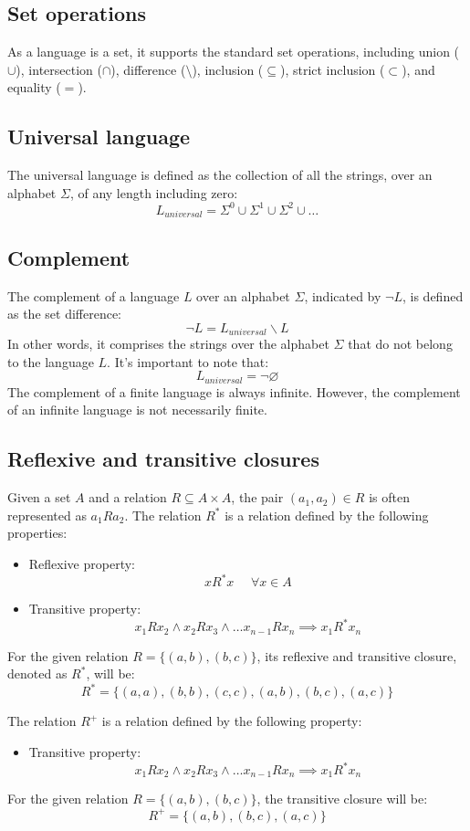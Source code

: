 \subsection*{Set operations}  
As a language is a set, it supports the standard set operations, including union ($\cup$), intersection ($\cap$), difference ($ \setminus $), inclusion ($ \subseteq $), strict inclusion ($ \subset $), and equality ($=$). 

\subsection*{Universal language} 
The universal language is defined as the collection of all the strings, over an alphabet $\Sigma$, of any length including zero: 
\[L_{universal}=\Sigma ^0 \cup \Sigma ^1 \cup \Sigma ^2 \cup \dots \]

\subsection*{Complement} 
The complement of a language $L$ over an alphabet $\Sigma$, indicated by $\lnot L$, is defined as the set difference:
\[\lnot L=L_{universal}\backslash L\]
In other words, it comprises the strings over the alphabet $\Sigma$ that do not belong to the language $L$.
It's important to note that:
\[L_{universal} = \lnot \varnothing\]
The complement of a finite language is always infinite.
However, the complement of an infinite language is not necessarily finite.

\subsection*{Reflexive and transitive closures} 
Given a set $A$ and a relation $R \subseteq A \times A$, the pair $(a_1, a_2) \in R$ is often represented as $a_1Ra_2$. 
The relation $R^{*}$ is a relation defined by the following properties:
\begin{itemize}
    \item Reflexive property:
        \[xR^{*}x \:\:\:\:\:\: \forall x \in A\]
    \item Transitive property: 
        \[x_1Rx_2 \land x_2Rx_3 \land \dots x_{n-1}Rx_n \implies x_1R^{*}x_n\]
\end{itemize}
\begin{example}
    For the given relation $R = \{(a, b), (b, c)\}$, its reflexive and transitive closure, denoted as $R^{*}$, will be:
    \[R^{*} = \{(a, a), (b, b), (c, c), (a, b), (b, c), (a, c) \}\]
\end{example}
The relation $R^{+}$ is a relation defined by the following property: 
\begin{itemize}
    \item Transitive property: 
        \[x_1Rx_2 \land x_2Rx_3 \land \dots x_{n-1}Rx_n \implies x_1R^{*}x_n\]
\end{itemize}
\begin{example}
    For the given relation $R = \{(a, b), (b, c)\}$, the transitive closure will be: 
    \[R^{+} = \{ (a, b), (b, c), (a, c)\}\]
\end{example}

